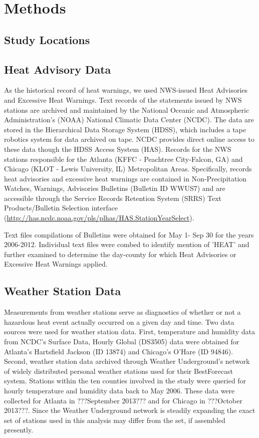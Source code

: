 \documentclass{ametsoc}
\begin{document}
\section{Methods}\label{section:methods}
\subsection{Study Locations}\label{subsec:locations}


\subsection{Heat Advisory Data}\label{subsec:NWSdata}
As the historical record of heat warnings, we used NWS-issued Heat Advisories and Excessive Heat Warnings. Text records of the statements issued by NWS stations are archived and maintained by the National Oceanic and Atmospheric Administration's (NOAA) National Climatic Data Center (NCDC). The data are stored in the Hierarchical Data Storage System (HDSS), which includes a tape robotics system for data archived on tape. NCDC provides direct online access to these data though the HDSS Access System (HAS). Records for the NWS stations responsible for the Atlanta (KFFC - Peachtree City-Falcon, GA) and Chicago (KLOT - Lewis University, IL) Metropolitan Areas. Specifically, records heat advisories and excessive heat warnings are contained in Non-Precipitation Watches, Warnings, Advisories Bulletins (Bulletin ID WWUS7) and are accessible through the Service Records Retention System (SRRS) Text Products/Bulletin Selection interface (\url{http://has.ncdc.noaa.gov/pls/plhas/HAS.StationYearSelect}).

Text files compilations of Bulletins were obtained for May 1- Sep 30 for the years 2006-2012. Individual text files were combed to identify mention of 'HEAT' and further examined to determine the day-county for which Heat Advisories or Excessive Heat Warnings applied. 

\subsection{Weather Station Data}\label{subsec:WUNDERdata}
Measurements from weather stations serve as diagnostics of whether or not a hazardous heat event actually occurred on a given day and time. Two data sources were used for weather station data. First, temperature and humidity data from NCDC's Surface Data, Hourly Global (DS3505) data were obtained for Atlanta's Hartsfield Jackson (ID 13874) and Chicago's O'Hare (ID 94846). Second, weather station data archived through Weather Underground's network of widely distributed personal weather stations used for their BestForecast\textsuperscript{\textregistered} system. Stations within the ten counties involved in the study were queried for hourly temperature and humidity data back to May 2006. These data were collected for Atlanta in ???September 2013??? and for Chicago in ???October 2013???. Since the Weather Underground network is steadily expanding the exact set of stations used in this analysis may differ from the set, if assembled presently. 
\end{document}
